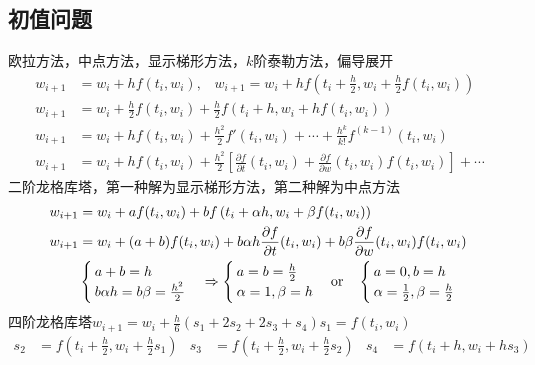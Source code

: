 \documentclass[twocolumn]{article}
\begin{document}
\subsection{初值问题}
欧拉方法，中点方法，显示梯形方法，$k$阶泰勒方法，偏导展开
\begin{align*}
    w_{i+1} & =w_i+hf(t_i,w_i),\,\,\,\,\, w_{i+1}=w_i+hf\left(t_i+\frac{h}{2},w_i+\frac{h}{2}f(t_i,w_i)\right)                                                       \\
    w_{i+1} & =w_{i}+\frac{h}{2}f(t_i,w_i)+\frac{h}{2}f\left(t_i+h,w_i+hf(t_i,w_i)\right)                                                                 \\
    w_{i+1} & =w_i+hf(t_i,w_i)+\frac{h^2}{2}f'(t_i,w_i)+\cdots+\frac{h^k}{k!}f^{(k-1)}(t_i,w_i)                                                           \\
    w_{i+1} & =w_i+hf(t_i,w_i)+\frac{h^2}{2}\left[ \frac{\partial f}{\partial t}(t_i,w_i)+\frac{\partial f}{\partial w}(t_i,w_i)f(t_i,w_i) \right]+\cdots
\end{align*}
二阶龙格库塔，第一种解为显示梯形方法，第二种解为中点方法
\begin{align*}
    w_{i+1} & =w_i+af(t_i,w_i)+bf\left(t_i+\alpha h,w_i+\beta f(t_i,w_i)\right)                                                           \\
    w_{i+1} & =w_i+(a+b)f(t_i,w_i)+b\alpha h\frac{\partial f}{\partial t}(t_i,w_i)+b\beta\frac{\partial f}{\partial w}(t_i,w_i)f(t_i,w_i) \\
            &
    \begin{cases}
        a+b=h \\
        b\alpha h=b\beta=\frac{h^2}{2}
    \end{cases}
    \Rightarrow
    \begin{cases}
        a=b=\frac{h}{2} \\
        \alpha=1,\beta=h
    \end{cases}
    \text{or\quad}
    \begin{cases}
        a=0,b=h \\
        \alpha=\frac{1}{2},\beta=\frac{h}{2}
    \end{cases}
\end{align*}
四阶龙格库塔\qquad$w_{i+1}=w_i+\frac{h}{6}(s_1+2s_2+2s_3+s_4)$\qquad$s_1=f(t_i,w_i)$
\begin{align*}
    s_2 & =f\left( t_i+\frac{h}{2},w_i+\frac{h}{2}s_1 \right) & s_3 & =f\left( t_i+\frac{h}{2},w_i+\frac{h}{2}s_2 \right) & s_4 & =f\left( t_i+h,w_i+hs_3 \right)
\end{align*}
\end{document}
